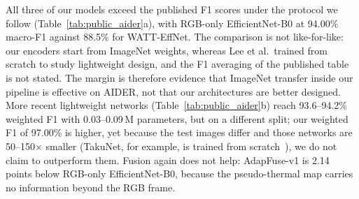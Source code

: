 \documentclass[journal]{IEEEtran}
\begin{document}
All three of our models exceed the published F1 scores under the protocol we follow (Table~\ref{tab:public_aider}a), with RGB-only EfficientNet-B0 at 94.00\% macro-F1 against 88.5\% for WATT-EffNet. The comparison is not like-for-like: our encoders start from ImageNet weights, whereas Lee et al.\ trained from scratch to study lightweight design, and the F1 averaging of the published table is not stated. The margin is therefore evidence that ImageNet transfer inside our pipeline is effective on AIDER, not that our architectures are better designed. More recent lightweight networks (Table~\ref{tab:public_aider}b) reach 93.6--94.2\% weighted F1 with 0.03--0.09\,M parameters, but on a different split; our weighted F1 of 97.00\% is higher, yet because the test images differ and those networks are 50--150$\times$ smaller (TakuNet, for example, is trained from scratch~\cite{rossi2025takunet}), we do not claim to outperform them. Fusion again does not help: AdapFuse-v1 is 2.14 points below RGB-only EfficientNet-B0, because the pseudo-thermal map carries no information beyond the RGB frame.

\begin{table}[!t]
\centering
\caption[Per-class AIDER results]{Per-class results on the AIDER 4:1:2 test set (P, R, F1 in \%; $n$: test images).}
\label{tab:public_aider_perclass}
\end{table}
\end{document}
